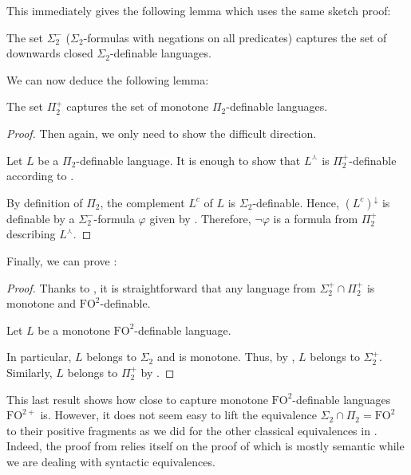\documentclass[a4paper,UKenglish,cleveref, autoref, thm-restate]{lipics-v2021}
\newcommand{\dualmon}{\curlywedge}
\newcommand{\FO}{\mathrm{FO}}
\newcommand{\FOtw}{\FO^2}
\newcommand{\FOtwp}{\FO^{2+}}
\begin{document}
This immediately gives the following lemma which uses the same sketch proof:

\begin{lemma}\label{lem:sig2-}
    The set $\Sigma_2^-$ ($\Sigma_2$-formulas with negations on all predicates) captures the set of downwards closed $\Sigma_2$-definable languages.
\end{lemma}



We can now deduce the following lemma:

\begin{lemma}\label{pi2+}
    The set $\Pi_2^+$ captures the set of monotone $\Pi_2$-definable languages.
\end{lemma}


\begin{proof}
    Then again, we only need to show the difficult direction.
    

    Let $L$ be a $\Pi_2$-definable language.
    It is enough to show that $L^\dualmon$ is $\Pi_2^+$-definable according to .

    By definition of $\Pi_2$, the complement $L^c$ of $L$ is $\Sigma_2$-definable.
    Hence, $(L^c)^\downarrow$ is definable by a $\Sigma_2^-$-formula $\varphi$ given by .
    Therefore, $\neg \varphi$ is a formula from $\Pi_2^+$ describing $L^\dualmon$.
\end{proof}








Finally, we can prove :

\begin{proof}
    Thanks to \cite{OneQuantifierAlternation}, it is straightforward that any language from $\Sigma_2^+ \cap \Pi_2^+$ is monotone and $\FOtw$-definable.

    Let $L$ be a monotone $\FOtw$-definable language.

    In particular, $L$ belongs to $\Sigma_2$ and is monotone.
    Thus, by , $L$ belongs to $\Sigma_2^+$.
    Similarly, $L$ belongs to $\Pi_2^+$ by .
\end{proof}




This last result shows how close to capture monotone $\FOtw$-definable languages $\FOtwp$ is.
However, it does not seem easy to lift the equivalence $\Sigma_2 \cap \Pi_2 = \FOtw$ to their positive fragments as we did for the other classical equivalences in .
Indeed, the proof from \cite{OneQuantifierAlternation} relies itself on the proof of \cite{PolynomialClosure} which is mostly semantic while we are dealing with syntactic equivalences.
\end{document}
